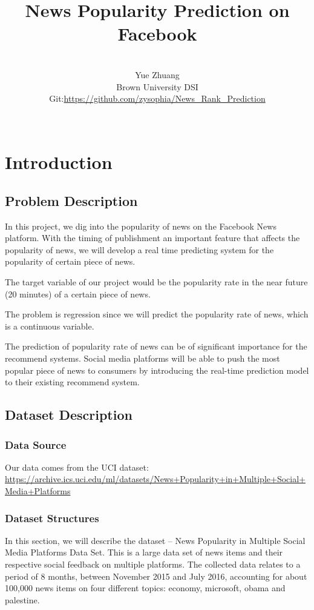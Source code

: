 \documentclass{article}
\title{News Popularity Prediction on Facebook}
\author{\\Yue Zhuang\\
Brown University DSI\\
Git:\url{https://github.com/zysophia/News_Rank_Prediction}\\\\}
\date{}
\begin{document}
\maketitle

\section{Introduction}
\subsection{Problem Description}
In this project, we dig into the popularity of news on the Facebook News platform. With the timing of publishment an important feature that affects the popularity of news, we will develop a real time predicting system for the popularity of certain piece of news.\par
The target variable of our project would be the popularity rate in the near future (20 minutes) of a certain piece of news.\par
The problem is regression since we will predict the popularity rate of news, which is a continuous variable.\par
The prediction of popularity rate of news can be of significant importance for the recommend systems. Social media platforms will be able to push the most popular piece of news to consumers by introducing the real-time prediction model to their existing recommend system.

\subsection{Dataset Description}
\subsubsection{Data Source}
Our data comes from the UCI dataset:
\url{https://archive.ics.uci.edu/ml/datasets/News+Popularity+in+Multiple+Social+Media+Platforms}
\subsubsection{Dataset Structures}
In this section, we will describe the dataset – News Popularity in Multiple Social Media Platforms Data Set. This is a large data set of news items and their respective social feedback on multiple platforms. The collected data relates to a period of 8 months, between November 2015 and July 2016, accounting for about 100,000 news items on four different topics: economy, microsoft, obama and palestine.
\end{document}
